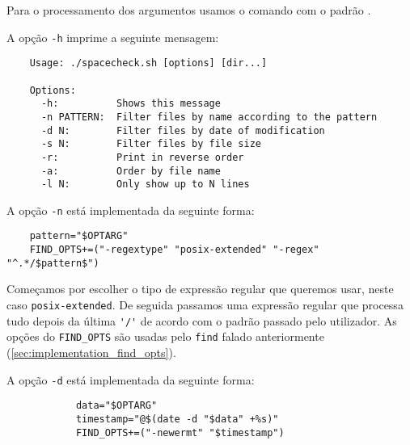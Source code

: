 Para o processamento dos argumentos usamos o comando  com o padrão .

A opção \Verb|-h| imprime a seguinte mensagem:

\begin{listing}[H]
	\centering
	\begin{verbatim}
    Usage: ./spacecheck.sh [options] [dir...]

    Options:
      -h:          Shows this message
      -n PATTERN:  Filter files by name according to the pattern
      -d N:        Filter files by date of modification
      -s N:        Filter files by file size
      -r:          Print in reverse order
      -a:          Order by file name
      -l N:        Only show up to N lines
  \end{verbatim}
\end{listing}

A opção \Verb|-n| está implementada da seguinte forma:

\begin{listing}[H]
	\centering
	\begin{verbatim}
    pattern="$OPTARG"
    FIND_OPTS+=("-regextype" "posix-extended" "-regex" "^.*/$pattern$")
  \end{verbatim}
\end{listing}

Começamos por escolher o tipo de expressão regular que queremos usar, neste caso \Verb|posix-extended|.
De seguida passamos uma expressão regular que processa tudo depois da última \Verb|'/'| de acordo com o padrão passado pelo utilizador.
As opções do \Verb|FIND_OPTS| são usadas pelo \Verb|find| falado anteriormente (\ref{sec:implementation_find_opts}).

A opção \Verb|-d| está implementada da seguinte forma:

\begin{listing}[H]
	\centering
	\begin{verbatim}
			data="$OPTARG"
			timestamp="@$(date -d "$data" +%s)"
			FIND_OPTS+=("-newermt" "$timestamp")
  \end{verbatim}
\end{listing}

